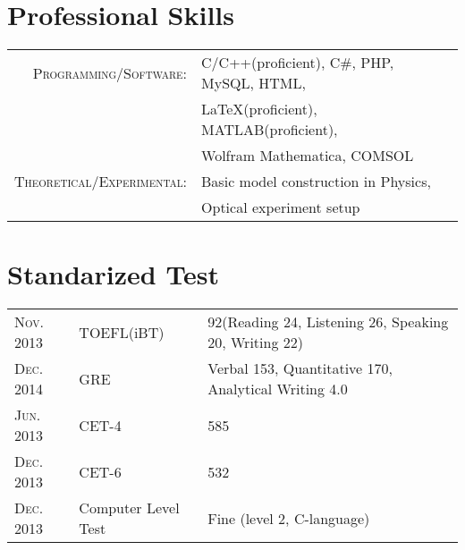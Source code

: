 \documentclass[ENG]{Sketch}
\begin{document}
\section{Professional Skills}
\begin{tabular}{rl}
 \textsc{Programming/Software:}&C/C++(proficient), C\#, PHP, MySQL, HTML, \\& \LaTeX (proficient), MATLAB(proficient),\\ & Wolfram Mathematica, COMSOL\\
\textsc{Theoretical/Experimental:}&Basic model construction in Physics, \\&Optical experiment setup\\
\end{tabular}

\section{Standarized Test}
\begin{tabular}{l|ll}
 \textsc{Nov. 2013} & TOEFL(iBT) & 92(Reading 24, Listening 26, Speaking 20, Writing 22) \\
 \textsc{Dec. 2014} & GRE & Verbal 153, Quantitative 170, Analytical Writing 4.0 \\
 \textsc{Jun. 2013} & CET-4 & 585 \\
 \textsc{Dec. 2013} & CET-6 & 532 \\
 \textsc{Dec. 2013} & Computer Level Test & Fine (level 2, C-language) \\
\end{tabular}

\clearpage
\end{document}

